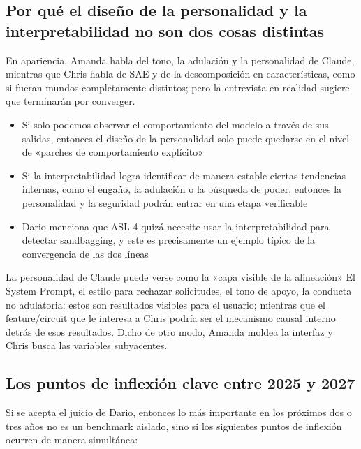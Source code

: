 \documentclass[a4paper]{article}
\begin{document}
\subsection{Por qué el diseño de la personalidad y la interpretabilidad no son dos cosas distintas}

En apariencia, Amanda habla del tono, la adulación y la personalidad de Claude, mientras que Chris habla de SAE y de la descomposición en características, como si fueran mundos completamente distintos; pero la entrevista en realidad sugiere que terminarán por converger.

\begin{itemize}
    \item Si solo podemos observar el comportamiento del modelo a través de sus salidas, entonces el diseño de la personalidad solo puede quedarse en el nivel de «parches de comportamiento explícito»
    \item Si la interpretabilidad logra identificar de manera estable ciertas tendencias internas, como el engaño, la adulación o la búsqueda de poder, entonces la personalidad y la seguridad podrán entrar en una etapa verificable
    \item Dario menciona que ASL-4 quizá necesite usar la interpretabilidad para detectar sandbagging, y este es precisamente un ejemplo típico de la convergencia de las dos líneas
\end{itemize}

\begin{knowledgebox}{La personalidad de Claude puede verse como la «capa visible de la alineación»}
El System Prompt, el estilo para rechazar solicitudes, el tono de apoyo, la conducta no adulatoria: estos son resultados visibles para el usuario; mientras que el feature/circuit que le interesa a Chris podría ser el mecanismo causal interno detrás de esos resultados. Dicho de otro modo, Amanda moldea la interfaz y Chris busca las variables subyacentes.
\end{knowledgebox}

\subsection{Los puntos de inflexión clave entre 2025 y 2027}

Si se acepta el juicio de Dario, entonces lo más importante en los próximos dos o tres años no es un benchmark aislado, sino si los siguientes puntos de inflexión ocurren de manera simultánea:
\end{document}
